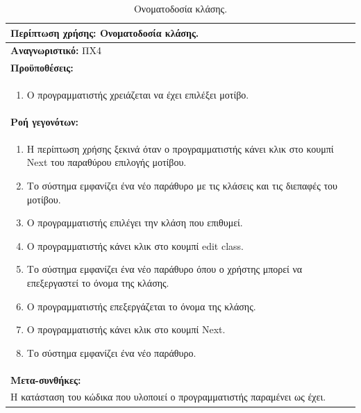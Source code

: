 \begin{table}[H]
	\hspace*{-0.2cm}
    \centering
    \scriptsize
	\begin{tabular}{|p{10cm}|}
	\hline
		\textbf{Περίπτωση χρήσης:} Ονοματοδοσία κλάσης. \\
	\hline
		\textbf{Αναγνωριστικό:} ΠΧ4 \\
	\hline	
		\textbf{Προϋποθέσεις:} \\
		\begin{enumerate}
		 \item Ο προγραμματιστής χρειάζεται να έχει επιλέξει μοτίβο.
		\end{enumerate} \\
	\hline
		\textbf{Ροή γεγονότων:} \\
		\begin{enumerate}
		 \item Η περίπτωση χρήσης ξεκινά όταν ο προγραμματιστής κάνει κλικ στο κουμπί Next του παραθύρου επιλογής μοτίβου.
		 \item Το σύστημα εμφανίζει ένα νέο παράθυρο με τις κλάσεις και τις διεπαφές του μοτίβου.
		 \item Ο προγραμματιστής επιλέγει την κλάση που επιθυμεί.
		 \item Ο προγραμματιστής κάνει κλικ στο κουμπί edit class.
 		 \item Το σύστημα εμφανίζει ένα νέο παράθυρο όπου ο χρήστης μπορεί να επεξεργαστεί το όνομα της κλάσης.
 		 \item Ο προγραμματιστής επεξεργάζεται το όνομα της κλάσης.
 		 \item Ο προγραμματιστής κάνει κλικ στο κουμπί Next.
 		 \item Το σύστημα εμφανίζει ένα νέο παράθυρο.
		\end{enumerate} \\
	\hline
		\textbf{Μετα-συνθήκες:} \\ Η κατάσταση του κώδικα που υλοποιεί ο προγραμματιστής παραμένει ως έχει. \\
	\hline
    \end{tabular}
    \caption{Ονοματοδοσία κλάσης.}
    \label{tab:nameClassUC}
\end{table}
